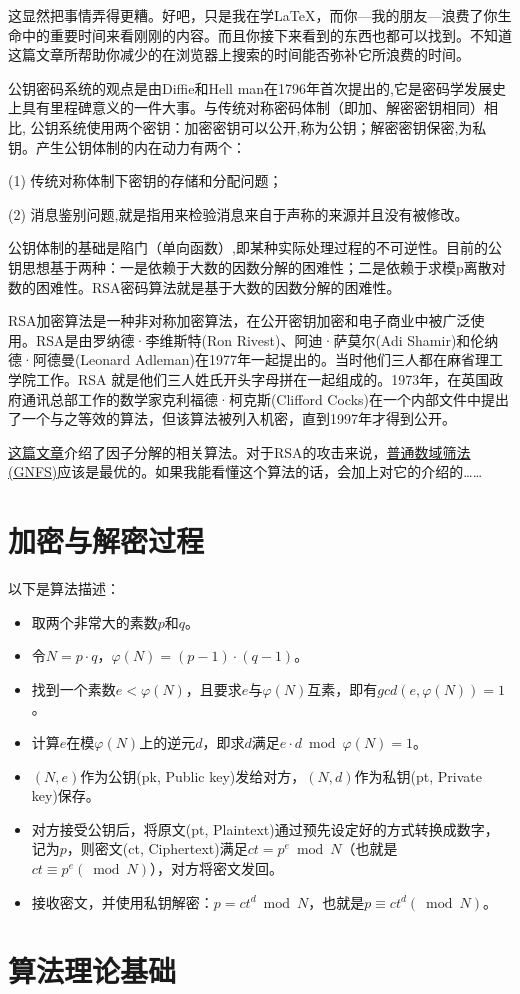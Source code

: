 \documentclass[a4paper]{article}  %
\begin{document}
\clearpage
这显然把事情弄得更糟。好吧，只是我在学\LaTeX，而你---我的朋友---浪费了你生命中的重要时间来看刚刚的内容。而且你接下来看到的东西也都可以找到。不知道这篇文章所帮助你减少的在浏览器上搜索的时间能否弥补它所浪费的时间。

公钥密码系统的观点是由Diffie和Hell man在1796年首次提出的,它是密码学发展史上具有里程碑意义的一件大事。与传统对称密码体制（即加、解密密钥相同）相比,
公钥系统使用两个密钥：加密密钥可以公开,称为公钥；解密密钥保密,为私钥。产生公钥体制的内在动力有两个：

(1) 传统对称体制下密钥的存储和分配问题；

(2) 消息鉴别问题,就是指用来检验消息来自于声称的来源并且没有被修改。

公钥体制的基础是陷门（单向函数）,即某种实际处理过程的不可逆性。目前的公钥思想基于两种：一是依赖于大数的因数分解的困难性；二是依赖于求模p离散对数的困难性。RSA密码算法就是基于大数的因数分解的困难性。

RSA加密算法是一种非对称加密算法，在公开密钥加密和电子商业中被广泛使用。RSA是由罗纳德·李维斯特(Ron Rivest)、阿迪·萨莫尔(Adi Shamir)和伦纳德·阿德曼(Leonard Adleman)在1977年一起提出的。当时他们三人都在麻省理工学院工作。RSA 就是他们三人姓氏开头字母拼在一起组成的。1973年，在英国政府通讯总部工作的数学家克利福德·柯克斯(Clifford Cocks)在一个内部文件中提出了一个与之等效的算法，但该算法被列入机密，直到1997年才得到公开。

\href{https://mathmu.github.io/MTCAS/doc/IntegerFactorization.html}{这篇文章}介绍了因子分解的相关算法。对于RSA的攻击来说，\href{https://zh.wikipedia.org/wiki/%E6%99%AE%E9%80%9A%E6%95%B0%E5%9F%9F%E7%AD%9B%E9%80%89%E6%B3%95}{普通数域筛法(GNFS)}应该是最优的。如果我能看懂这个算法的话，会加上对它的介绍的…… %

\section[算法描述]{加密与解密过程}

以下是算法描述：
\begin{itemize}
    \item 取两个非常大的素数$p$和$q$。
    \item 令$N = p \cdot q$，$\varphi(N) = (p - 1) \cdot (q - 1)$。
    \item 找到一个素数$e < \varphi(N)$，且要求$e$与$\varphi(N)$互素，即有$gcd(e, \varphi(N)) = 1$。 %
    \item 计算$e$在模$\varphi(N)$上的逆元$d$，即求$d$满足$e \cdot d \bmod \varphi(N) = 1$。
    \item $(N, e)$作为公钥(pk, Public key)发给对方，$(N, d)$作为私钥(pt, Private key)保存。
    \item 对方接受公钥后，将原文(pt, Plaintext)通过预先设定好的方式转换成数字，记为$p$，则密文(ct, Ciphertext)满足$ct = p ^ e \bmod N$（也就是$ct \equiv p ^ e (\bmod N)$），对方将密文发回。
    \item 接收密文，并使用私钥解密：$p = ct ^ d \bmod N$，也就是$p \equiv ct ^ d (\bmod N)$。
\end{itemize}

\section{算法理论基础}


\end{document}

